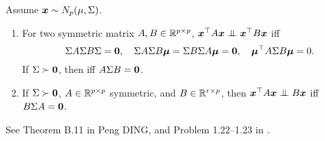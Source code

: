 \documentclass[10pt,a4paper]{book}
\begin{document}
\begin{thmbox}
	\begin{theorem}\label{thm:MVN_quad_indep}
		Assume ${\boldsymbol x}\sim N_p(\mu,\Sigma)$. 
		\begin{enumerate}
			\item 		For two symmetric matrix $A,B\in\mathbb R^{p\times p}$, $\x^\TT A \x\indep \x^\TT B\x$ iff  
			\begin{equation*}
				\Sigma A\Sigma B\Sigma={\boldsymbol 0},\quad\Sigma A\Sigma B{\boldsymbol\mu}=\Sigma B\Sigma A{\boldsymbol\mu}={\boldsymbol 0},\quad{\boldsymbol\mu}^\top A\Sigma B{\boldsymbol\mu}=0.
			\end{equation*}	
			If $\Sigma\succ {\boldsymbol 0}$, then iff $A\Sigma B={\boldsymbol 0}$.  
			\item If $\Sigma\succ {\boldsymbol 0}$, $A\in\mathbb R^{p\times p}$ symmetric, and $B\in\mathbb R^{r\times p}$, then $\x^\TT A\x \indep B\x$ iff $B\Sigma A={\boldsymbol 0}$.    
		\end{enumerate}
	\end{theorem}
\end{thmbox}
See Theorem B.11 in Peng DING, and Problem 1.22--1.23 in \cite{muirhead1982aspects}.
\end{document}
